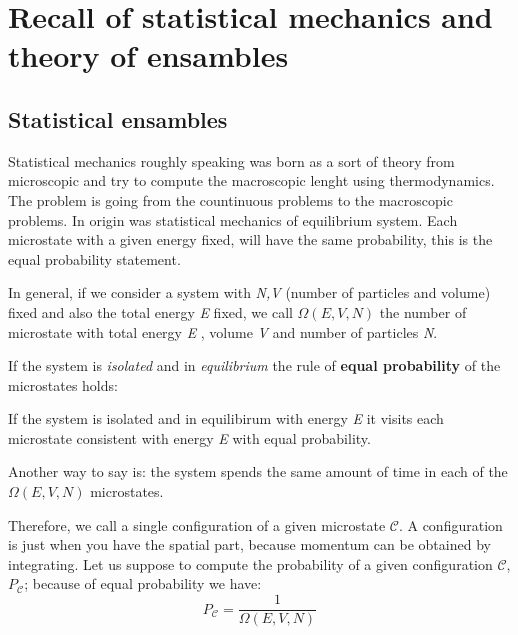 \documentclass[../main/main.tex]{subfiles}
\begin{document}
\chapter{Recall of statistical mechanics and theory of ensambles}

\section{Statistical ensambles}
Statistical mechanics roughly speaking was born as a sort of theory from microscopic and try to compute the macroscopic lenght using thermodynamics. The problem is going from the countinuous problems to the macroscopic problems. In origin was statistical mechanics of equilibrium system. Each microstate with a given energy fixed, will have the same probability, this is the equal probability statement.

In general, if we consider a system with \emph{N,V} (number of particles and volume) fixed and also the total energy \emph{E} fixed, we call \( \Omega (E,V,N) \)  the number of microstate with total energy \emph{E} , volume \emph{V} and number of particles \emph{N}.

If the system is \emph{isolated} and in \emph{equilibrium} the rule of \textbf{equal probability} of the microstates holds:
\begin{orangebox}
If the system is isolated and in equilibirum with energy \emph{E} it visits each microstate consistent with energy \emph{E} with equal probability.
\end{orangebox}
Another way to say is: the system spends the same amount of time in each of the \( \Omega (E,V,N) \) microstates.

Therefore, we call  a single configuration of a given microstate \( \mathcal{C}  \). A configuration is just when you have the spatial part, because momentum can be obtained by integrating.
Let us suppose to compute the probability of a given configuration \( \mathcal{C}  \), \( P_{\mathcal{C}} \); because of equal probability we have:
\begin{equation}
  P_{\mathcal{C}} = \frac{1}{\Omega (E,V,N)}
  \label{eq:}
\end{equation}
\end{document}
